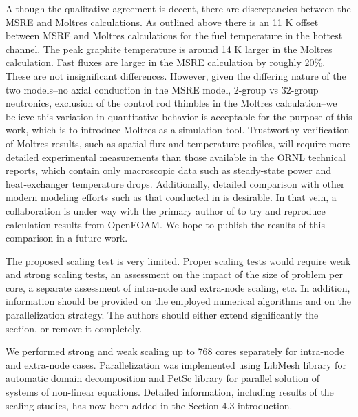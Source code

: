 \documentclass[answers,11pt]{exam}
\begin{document}
\begin{questions}
\begin{solution}
        Although the qualitative agreement is decent, there are discrepancies between
        the \gls{MSRE} and Moltres calculations. As outlined above there is an 11 K
        offset between \gls{MSRE} and Moltres calculations for the fuel temperature in
        the hottest channel. The peak graphite temperature is around 14 K larger in the
        Moltres calculation. Fast fluxes are larger in the \gls{MSRE} calculation by
        roughly 20\%. These are not insignificant differences. However, given the
        differing nature of the two models--no axial conduction in the \gls{MSRE} model,
        2-group vs 32-group neutronics, exclusion of the control rod thimbles in the
        Moltres calculation--we believe this variation in quantitative behavior is
        acceptable for the purpose of this work, which is to introduce Moltres as a
        simulation tool. Trustworthy verification of Moltres results, such as spatial flux
        and temperature profiles, will require more detailed experimental measurements
        than those available in the \gls{ORNL} technical reports, which contain only
        macroscopic data such as steady-state power and heat-exchanger temperature
        drops. Additionally, detailed comparison with other modern modeling efforts such
        as that conducted in \cite{aufiero_development_2014,laureau_transient_2017} is
        desirable. In that vein, a collaboration is under way with the primary author of
        \cite{aufiero_develoment_2014} to try and reproduce calculation results from
        OpenFOAM. We hope to publish the results of this comparison in a future work.
\end{solution}

\question The proposed scaling test is very limited. Proper scaling tests would
require weak and strong scaling tests, an assessment on the impact of the size
of problem per core, a separate assessment of intra-node and extra-node scaling,
etc. In addition, information should be provided on the employed numerical
algorithms and on the parallelization strategy. The authors should either extend
significantly the section, or remove it completely.
\begin{solution}
        We performed strong and weak scaling up to 768 cores separately for
        intra-node and extra-node cases. Parallelization was implemented using
        LibMesh library for automatic domain decomposition and PetSc
        library for parallel solution of systems of non-linear equations.
        Detailed information, including results of the scaling studies, has now
        been added in the Section 4.3 introduction.
\end{solution}


\end{questions}


  
\end{document}
